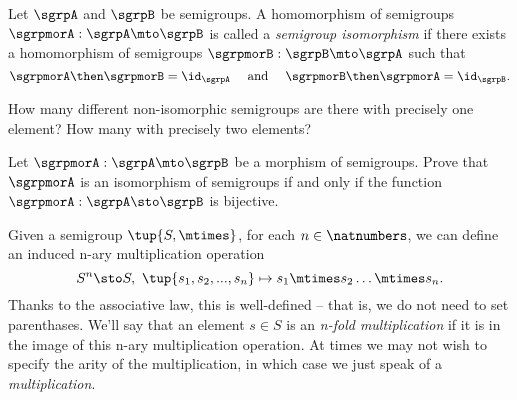 \begin{definition}
  \label{def:semigroup-iso}
Let $\sgrpA$ and $\sgrpB$ be semigroups. A homomorphism of semigroups $\sgrpmorA: \sgrpA \mto \sgrpB$ is called a \emph{semigroup isomorphism} if there exists a homomorphism of semigroups $\sgrpmorB: \sgrpB \mto \sgrpA$ such that
\begin{equation}\label{sgrp-iso-cond}
\sgrpmorA \then \sgrpmorB = \id_\sgrpA \quad \text{ and } \quad  \sgrpmorB \then \sgrpmorA = \id_\sgrpB.
\end{equation}
\end{definition}

\begin{exercise}
How many different non-isomorphic semigroups are there with precisely one element? How many with precisely two elements?
\end{exercise}
\begin{solution}
\end{solution}

\begin{exercise}
Let $\sgrpmorA: \sgrpA \mto \sgrpB$ be a morphism of semigroups. Prove that $\sgrpmorA$ is an isomorphism of semigroups if and only if the function $\sgrpmorA: \sgrpA \sto \sgrpB$ is bijective.
\end{exercise}
\begin{solution}
\end{solution}


Given a semigroup $\tup{S, \mtimes}$, for each $n \in \natnumbers$, we can define an induced n-ary multiplication operation
$$
S^n \sto S, \ \tup{s_1, s_2, ..., s_n} \mapsto s_1 \mtimes s_2 \dots \mtimes s_n.
$$
Thanks to the associative law, this is well-defined -- that is, we do not need to set parenthases. We'll say that an element $s \in S$ is an \emph{n-fold multiplication} if it is in the image of this n-ary multiplication operation. At times we may not wish to specify the arity of the multiplication, in which case we just speak of a \emph{multiplication}. 
